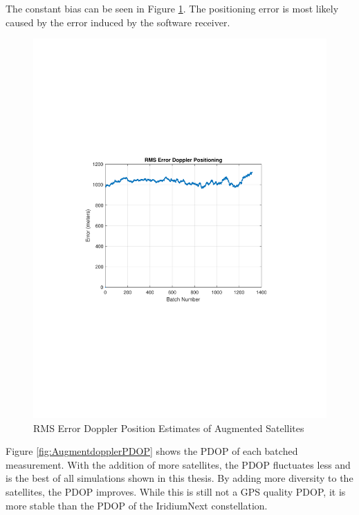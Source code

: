 \documentclass[12pt]{report}
\begin{document}
The constant bias can be seen in Figure \ref{fig:AugmentdopplerRMSE}. The positioning error is most likely caused by the error induced by the software receiver. 
\begin{figure}[h!]
    \centering
    \includegraphics[trim=1.2in 3.3in 1.75in 3.3in,clip,width=5in]
    {Augment_5min_Doppler_RMSE.pdf}
    \caption{RMS Error Doppler Position Estimates of Augmented Satellites}
    \label{fig:AugmentdopplerRMSE}
\end{figure}
Figure \ref{fig:AugmentdopplerPDOP} shows the PDOP of each batched measurement. With the addition of more satellites, the PDOP fluctuates less and is the best of all simulations shown in this thesis. By adding more diversity to the satellites, the PDOP improves. While this is still not a GPS quality PDOP, it is more stable than the PDOP of the IridiumNext constellation.
\end{document}
